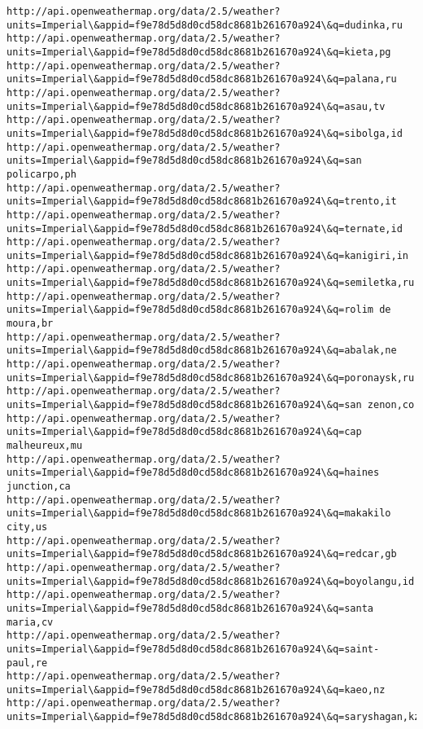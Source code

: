 \documentclass[11pt]{article}
\begin{document}
\begin{Verbatim}[commandchars=\\\{\}]
http://api.openweathermap.org/data/2.5/weather?units=Imperial\&appid=f9e78d5d8d0cd58dc8681b261670a924\&q=dudinka,ru
http://api.openweathermap.org/data/2.5/weather?units=Imperial\&appid=f9e78d5d8d0cd58dc8681b261670a924\&q=kieta,pg
http://api.openweathermap.org/data/2.5/weather?units=Imperial\&appid=f9e78d5d8d0cd58dc8681b261670a924\&q=palana,ru
http://api.openweathermap.org/data/2.5/weather?units=Imperial\&appid=f9e78d5d8d0cd58dc8681b261670a924\&q=asau,tv
http://api.openweathermap.org/data/2.5/weather?units=Imperial\&appid=f9e78d5d8d0cd58dc8681b261670a924\&q=sibolga,id
http://api.openweathermap.org/data/2.5/weather?units=Imperial\&appid=f9e78d5d8d0cd58dc8681b261670a924\&q=san policarpo,ph
http://api.openweathermap.org/data/2.5/weather?units=Imperial\&appid=f9e78d5d8d0cd58dc8681b261670a924\&q=trento,it
http://api.openweathermap.org/data/2.5/weather?units=Imperial\&appid=f9e78d5d8d0cd58dc8681b261670a924\&q=ternate,id
http://api.openweathermap.org/data/2.5/weather?units=Imperial\&appid=f9e78d5d8d0cd58dc8681b261670a924\&q=kanigiri,in
http://api.openweathermap.org/data/2.5/weather?units=Imperial\&appid=f9e78d5d8d0cd58dc8681b261670a924\&q=semiletka,ru
http://api.openweathermap.org/data/2.5/weather?units=Imperial\&appid=f9e78d5d8d0cd58dc8681b261670a924\&q=rolim de moura,br
http://api.openweathermap.org/data/2.5/weather?units=Imperial\&appid=f9e78d5d8d0cd58dc8681b261670a924\&q=abalak,ne
http://api.openweathermap.org/data/2.5/weather?units=Imperial\&appid=f9e78d5d8d0cd58dc8681b261670a924\&q=poronaysk,ru
http://api.openweathermap.org/data/2.5/weather?units=Imperial\&appid=f9e78d5d8d0cd58dc8681b261670a924\&q=san zenon,co
http://api.openweathermap.org/data/2.5/weather?units=Imperial\&appid=f9e78d5d8d0cd58dc8681b261670a924\&q=cap malheureux,mu
http://api.openweathermap.org/data/2.5/weather?units=Imperial\&appid=f9e78d5d8d0cd58dc8681b261670a924\&q=haines junction,ca
http://api.openweathermap.org/data/2.5/weather?units=Imperial\&appid=f9e78d5d8d0cd58dc8681b261670a924\&q=makakilo city,us
http://api.openweathermap.org/data/2.5/weather?units=Imperial\&appid=f9e78d5d8d0cd58dc8681b261670a924\&q=redcar,gb
http://api.openweathermap.org/data/2.5/weather?units=Imperial\&appid=f9e78d5d8d0cd58dc8681b261670a924\&q=boyolangu,id
http://api.openweathermap.org/data/2.5/weather?units=Imperial\&appid=f9e78d5d8d0cd58dc8681b261670a924\&q=santa maria,cv
http://api.openweathermap.org/data/2.5/weather?units=Imperial\&appid=f9e78d5d8d0cd58dc8681b261670a924\&q=saint-paul,re
http://api.openweathermap.org/data/2.5/weather?units=Imperial\&appid=f9e78d5d8d0cd58dc8681b261670a924\&q=kaeo,nz
http://api.openweathermap.org/data/2.5/weather?units=Imperial\&appid=f9e78d5d8d0cd58dc8681b261670a924\&q=saryshagan,kz

\end{Verbatim}
\end{document}
